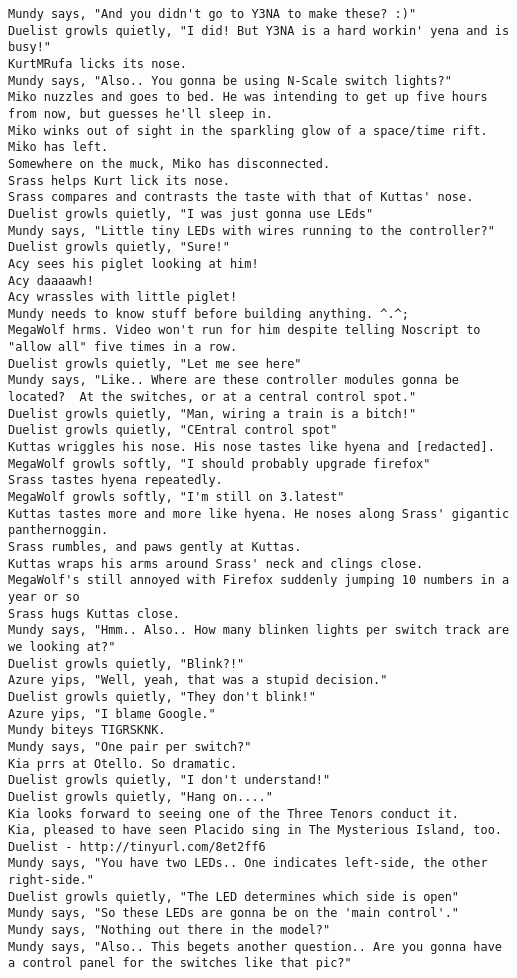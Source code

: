 \begin{verbatim}
Mundy says, "And you didn't go to Y3NA to make these? :)"
Duelist growls quietly, "I did! But Y3NA is a hard workin' yena and is busy!"
KurtMRufa licks its nose.
Mundy says, "Also.. You gonna be using N-Scale switch lights?"
Miko nuzzles and goes to bed. He was intending to get up five hours from now, but guesses he'll sleep in.
Miko winks out of sight in the sparkling glow of a space/time rift.
Miko has left.
Somewhere on the muck, Miko has disconnected.
Srass helps Kurt lick its nose.
Srass compares and contrasts the taste with that of Kuttas' nose.
Duelist growls quietly, "I was just gonna use LEds"
Mundy says, "Little tiny LEDs with wires running to the controller?"
Duelist growls quietly, "Sure!"
Acy sees his piglet looking at him!
Acy daaaawh!
Acy wrassles with little piglet!
Mundy needs to know stuff before building anything. ^.^;
MegaWolf hrms. Video won't run for him despite telling Noscript to "allow all" five times in a row.
Duelist growls quietly, "Let me see here"
Mundy says, "Like.. Where are these controller modules gonna be located?  At the switches, or at a central control spot."
Duelist growls quietly, "Man, wiring a train is a bitch!"
Duelist growls quietly, "CEntral control spot"
Kuttas wriggles his nose. His nose tastes like hyena and [redacted].
MegaWolf growls softly, "I should probably upgrade firefox"
Srass tastes hyena repeatedly.
MegaWolf growls softly, "I'm still on 3.latest"
Kuttas tastes more and more like hyena. He noses along Srass' gigantic panthernoggin.
Srass rumbles, and paws gently at Kuttas.
Kuttas wraps his arms around Srass' neck and clings close.
MegaWolf's still annoyed with Firefox suddenly jumping 10 numbers in a year or so
Srass hugs Kuttas close.
Mundy says, "Hmm.. Also.. How many blinken lights per switch track are we looking at?"
Duelist growls quietly, "Blink?!"
Azure yips, "Well, yeah, that was a stupid decision."
Duelist growls quietly, "They don't blink!"
Azure yips, "I blame Google."
Mundy biteys TIGRSKNK.
Mundy says, "One pair per switch?"
Kia prrs at Otello. So dramatic.
Duelist growls quietly, "I don't understand!"
Duelist growls quietly, "Hang on...."
Kia looks forward to seeing one of the Three Tenors conduct it.
Kia, pleased to have seen Placido sing in The Mysterious Island, too.
Duelist - http://tinyurl.com/8et2ff6
Mundy says, "You have two LEDs.. One indicates left-side, the other right-side."
Duelist growls quietly, "The LED determines which side is open"
Mundy says, "So these LEDs are gonna be on the 'main control'."
Mundy says, "Nothing out there in the model?"
Mundy says, "Also.. This begets another question.. Are you gonna have a control panel for the switches like that pic?"

\end{verbatim}
